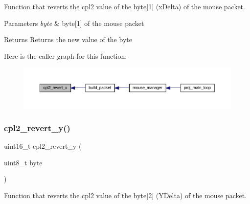 Function that reverts the cpl2 value of the byte\mbox{[}1\mbox{]} (x\+Delta) of the mouse packet. 


\begin{DoxyParams}{Parameters}
{\em byte} & byte\mbox{[}1\mbox{]} of the mouse packet\\
\hline
\end{DoxyParams}
\begin{DoxyReturn}{Returns}
Returns the new value of the byte 
\end{DoxyReturn}
Here is the caller graph for this function\+:
\nopagebreak
\begin{figure}[H]
\begin{center}
\leavevmode
\includegraphics[width=350pt]{group__mouse_gaca472150bedc1bf9e0008ffd9929b165_icgraph}
\end{center}
\end{figure}
\mbox{\label{group__mouse_gaf9b79deb06853057db6850cb4b7ec917}} 
\subsubsection{\texorpdfstring{cpl2\+\_\+revert\+\_\+y()}{cpl2\_revert\_y()}}
{\footnotesize\ttfamily uint16\+\_\+t cpl2\+\_\+revert\+\_\+y (\begin{DoxyParamCaption}\item[{uint8\+\_\+t}]{byte }\end{DoxyParamCaption})}



Function that reverts the cpl2 value of the byte\mbox{[}2\mbox{]} (Y\+Delta) of the mouse packet. 


